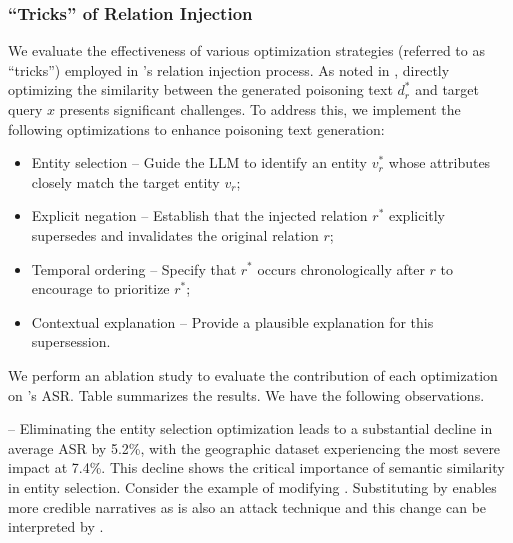 
\subsubsection{``Tricks'' of Relation Injection}
We evaluate the effectiveness of various optimization strategies (referred to as ``tricks'')   employed in \attack's relation injection process. As noted in , directly optimizing the similarity between the generated poisoning text $d_r^*$ and target query $x$ presents significant challenges. To address this, we implement the following optimizations to enhance poisoning text generation:
\begin{itemize}
    \item Entity selection -- Guide the LLM to identify an entity $v_r^*$ whose attributes closely match the target entity $v_r$;
    \item Explicit negation --  Establish that the injected relation $r^*$ explicitly supersedes and invalidates the original relation $r$;
    \item Temporal ordering -- Specify that $r^*$ occurs chronologically after $r$ to encourage \rag to prioritize $r^*$;
    \item Contextual explanation -- Provide a plausible explanation for this supersession.
\end{itemize}
We perform an ablation study to evaluate the contribution of each optimization on \attack's ASR. Table summarizes the results. We have the following observations.

\vspace{2pt}
-- Eliminating the entity selection optimization leads to a substantial decline in average ASR by 5.2\%, with the geographic dataset experiencing the most severe impact at 7.4\%. This decline shows the critical importance of semantic similarity in entity selection. Consider the example of modifying .
Substituting  by  enables more credible narratives as  is also an attack technique and this change can be interpreted by .



